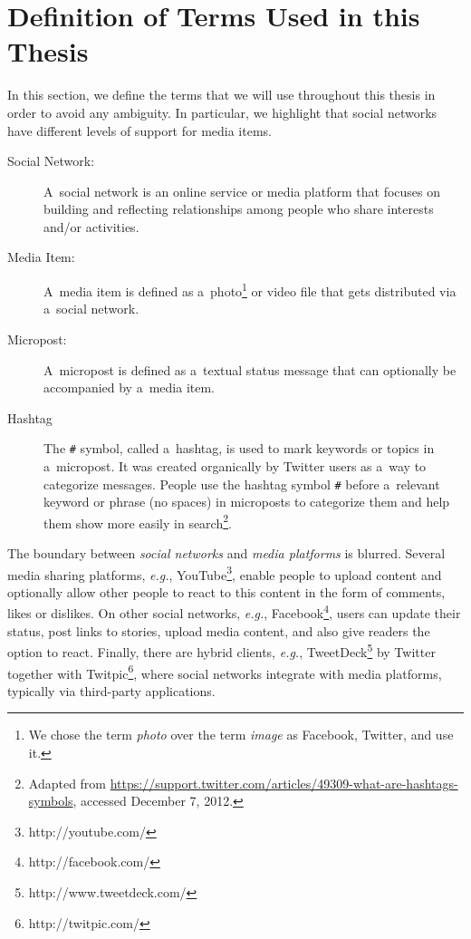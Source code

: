 \section{Definition of Terms Used in this Thesis}
\label{sec:definition}

In this section, we define the terms
that we will use throughout this thesis
in order to avoid any ambiguity.
In particular, we highlight that social networks have
different levels of support for media items.

\begin{description}
  \item[Social Network:]
       A~social network is an online service or media platform
       that focuses on building and reflecting
       relationships among people
       who share interests and/or activities.
  \item[Media Item:]
       A~media item is defined as
       a~photo\footnote{We chose the term \emph{photo}
       over the term \emph{image} as 
       Facebook, Twitter, and \googleplus use it.}
       or video
       file that gets distributed via a~social network.
  \item[Micropost:]
       A~micropost is defined as a~textual status message
       that can optionally be accompanied by a~media item.
  \item[Hashtag] The \texttt{\#} symbol, called a~hashtag,
       is used to mark keywords or topics in a~micropost.
       It was created organically by Twitter users
       as a~way to categorize messages.
       People use the hashtag symbol \texttt{\#} before a~relevant keyword
       or phrase (no spaces) in microposts to categorize them
       and help them show more easily in
       search\footnote{Adapted from
       \url{https://support.twitter.com/articles/49309-what-are-hashtags-symbols},
       accessed December 7, 2012.}. 
\end{description}

The boundary between \emph{social networks} and
\emph{media platforms} is blurred.
Several media sharing platforms, \emph{e.g.},
YouTube\footnote{http://youtube.com/},
enable people to upload content
and optionally allow other people to react
to this content in the form of comments, likes or dislikes.
On other social networks, \emph{e.g.},
Facebook\footnote{http://facebook.com/},
users can update their status, post links to stories,
upload media content, and also give readers the option to react.
Finally, there are hybrid clients, \emph{e.g.},
TweetDeck\footnote{http://www.tweetdeck.com/}
by Twitter together with
Twitpic\footnote{http://twitpic.com/},
where social networks integrate with media platforms,
typically via third-party applications.

